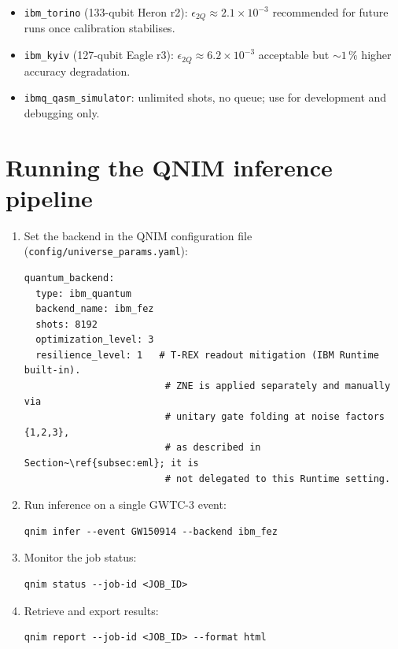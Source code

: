 \documentclass[11pt,a4paper, english]{book}
\theoremstyle{plain}
\theoremstyle{definition}
\numberwithin{equation}{chapter}
\numberwithin{figure}{chapter}
\numberwithin{table}{chapter}
\begin{document}
\begin{itemize}
  \item \texttt{ibm\_torino} (133-qubit Heron r2):
        $\epsilon_{2Q} \approx 2.1\times10^{-3}$  recommended for
        future runs once calibration stabilises.
  \item \texttt{ibm\_kyiv} (127-qubit Eagle r3):
        $\epsilon_{2Q} \approx 6.2\times10^{-3}$  acceptable but
        $\sim\!1\,\%$ higher accuracy degradation.
  \item \texttt{ibmq\_qasm\_simulator}: unlimited shots, no queue;
        use for development and debugging only.
\end{itemize}

\section{Running the QNIM inference pipeline}
\label{app:ibm-inference}

\begin{enumerate}
  \item Set the backend in the QNIM configuration file
        (\texttt{config/universe\_params.yaml}):
        \begin{verbatim}
quantum_backend:
  type: ibm_quantum
  backend_name: ibm_fez
  shots: 8192
  optimization_level: 3
  resilience_level: 1   # T-REX readout mitigation (IBM Runtime built-in).
                         # ZNE is applied separately and manually via
                         # unitary gate folding at noise factors {1,2,3},
                         # as described in Section~\ref{subsec:eml}; it is
                         # not delegated to this Runtime setting.
        \end{verbatim}

  \item Run inference on a single GWTC-3 event:
        \begin{verbatim}
qnim infer --event GW150914 --backend ibm_fez
        \end{verbatim}

  \item Monitor the job status:
        \begin{verbatim}
qnim status --job-id <JOB_ID>
        \end{verbatim}

  \item Retrieve and export results:
        \begin{verbatim}
qnim report --job-id <JOB_ID> --format html
        \end{verbatim}
\end{enumerate}
\end{document}

